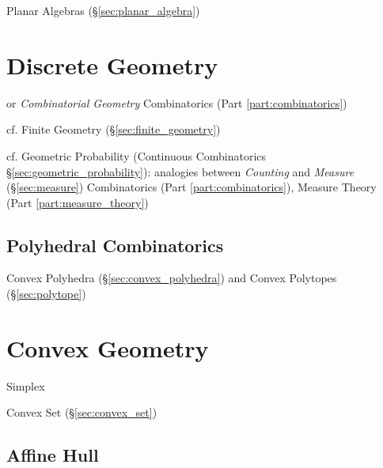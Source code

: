 Planar Algebras (\S\ref{sec:planar_algebra})




\section{Discrete Geometry}\label{sec:discrete_geometry}

or \emph{Combinatorial Geometry} \fist Combinatorics (Part
\ref{part:combinatorics})

cf. Finite Geometry (\S\ref{sec:finite_geometry})

\fist cf. Geometric Probability (Continuous Combinatorics
\S\ref{sec:geometric_probability}): analogies between \emph{Counting} and
\emph{Measure} (\S\ref{sec:measure}) \fist Combinatorics (Part
\ref{part:combinatorics}), Measure Theory (Part \ref{part:measure_theory})



\subsection{Polyhedral Combinatorics}\label{sec:polyhedral_combinatorics}

Convex Polyhedra (\S\ref{sec:convex_polyhedra}) and Convex Polytopes
(\S\ref{sec:polytope})



\section{Convex Geometry}\label{sec:convex_geometry}


Simplex

Convex Set (\S\ref{sec:convex_set})



\subsection{Affine Hull}\label{sec:affine_hull}

